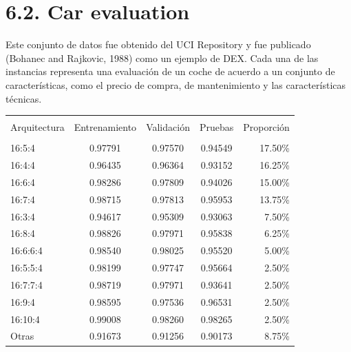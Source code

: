 \documentclass[spanish,a4paper,12pt,twoside]{report}
\begin{document}
  \section*{\Large 6.2. Car evaluation}
  Este conjunto de datos fue obtenido del UCI Repository y fue publicado (Bohanec and Rajkovic, 1988) como un ejemplo de DEX. Cada una de las instancias representa una evaluación de un coche de acuerdo a un conjunto de características, como el precio de compra, de mantenimiento y las características técnicas. \par
\begin{center}
     \label{table}
    \begin{tabular}{l c c c r}
      \hline \\ [-2ex]
      Arquitectura & Entrenamiento & Validación & Pruebas & Proporción \\ [0.5ex]
      \hline \\ [-1ex]
      16:5:4 & 0.97791 & 0.97570 & 0.94549 & 17.50\% \\ 
      16:4:4 & 0.96435 & 0.96364 & 0.93152 & 16.25\% \\
      16:6:4 & 0.98286 & 0.97809 & 0.94026 & 15.00\% \\
      16:7:4 & 0.98715 & 0.97813 & 0.95953 & 13.75\% \\
      16:3:4 & 0.94617 & 0.95309 & 0.93063 & 7.50\% \\
      16:8:4 & 0.98826 & 0.97971 & 0.95838 & 6.25\% \\
      16:6:6:4 & 0.98540 & 0.98025 & 0.95520 & 5.00\% \\
      16:5:5:4 & 0.98199 & 0.97747 & 0.95664 & 2.50\% \\
      16:7:7:4 & 0.98719 & 0.97971 & 0.93641 & 2.50\% \\
      16:9:4 & 0.98595 & 0.97536 & 0.96531 & 2.50\% \\
      16:10:4 & 0.99008 & 0.98260 & 0.98265 & 2.50\% \\
      Otras & 0.91673 & 0.91256 & 0.90173 & 8.75\% \\[1ex]
      \hline
    \end{tabular}
  \end{center} \par
\end{document}
